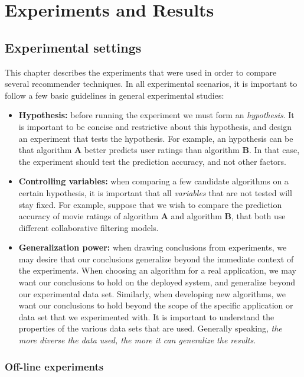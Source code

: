 \chapter{Experiments and Results} \label{results}

\section{Experimental settings} 

This chapter describes the experiments that were used in order
to compare several recommender techniques. In all experimental 
scenarios, it is important to follow a few basic guidelines in
general experimental studies\cite{adomavicius2011context}:
\begin{itemize} 
\item \textbf{Hypothesis:} before running the experiment we must form
an \textit{hypothesis}. It is important to be concise and restrictive
about this hypothesis, and design an experiment that tests the
hypothesis. For example, an hypothesis can be that algorithm
\textbf{A} better predicts user ratings than algorithm \textbf{B}. In
that case, the experiment should test the prediction accuracy, and not
other factors.
\item \textbf{Controlling variables:} when comparing a few candidate
algorithms on a certain hypothesis, it is important that all
\textit{variables} that are not tested will stay fixed. For example,
suppose that we wish to compare the prediction accuracy of movie
ratings of algorithm \textbf{A} and algorithm \textbf{B}, that both
use different collaborative filtering models.
\item \textbf{Generalization power:} when drawing conclusions from
experiments, we may desire that our conclusions generalize beyond the
immediate context of the experiments. When choosing an algorithm for a
real application, we may want our conclusions to hold on the deployed
system, and generalize beyond our experimental data set. Similarly,
when developing new algorithms, we want our conclusions to hold beyond
the scope of the specific application or data set that we experimented
with. It is important to understand the properties of the various data
sets that are used. Generally speaking, \textit{the more diverse the
data used, the more it can generalize the results}.
\end{itemize} 

\subsection{Off-line experiments} 


